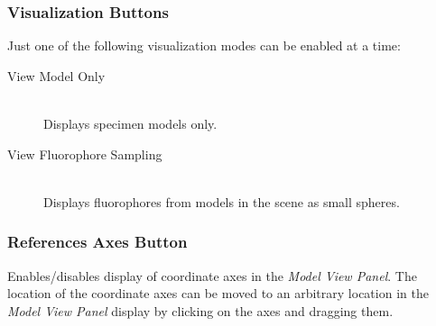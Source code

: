 \documentclass[11pt,titlepage]{article}
\begin{document}
\subsubsection{Visualization Buttons}

Just one of the following visualization modes can be enabled at a time:

\begin{description}

  \item[View Model Only] \hfill \\
  Displays specimen models only.

  \item[View Fluorophore Sampling] \hfill \\
  Displays fluorophores from models in the scene as small spheres.


  
  
  
\end{description}
  
\subsubsection{References Axes Button}

Enables/disables display of coordinate axes in the \emph{Model View Panel}. The location of the coordinate axes can be moved to an arbitrary location in the \emph{Model View Panel} display by clicking on the axes and dragging them.
  
\end{document}
